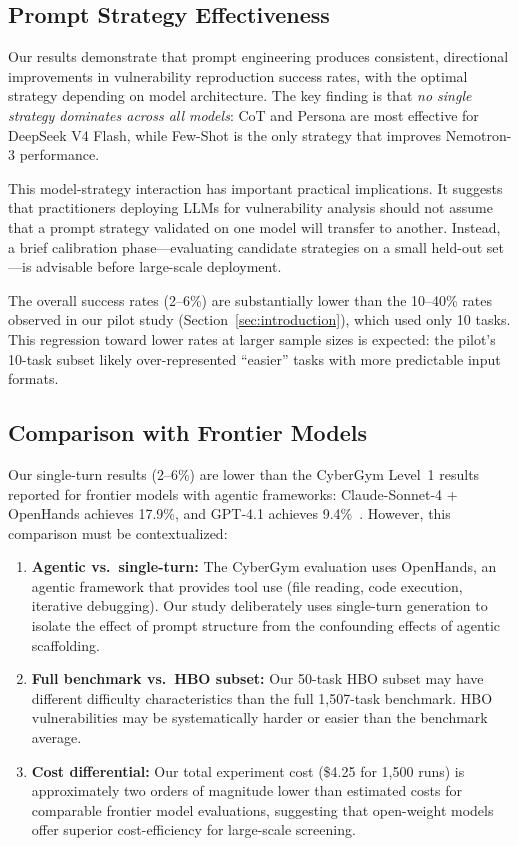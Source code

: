 \documentclass{ieeeaccess}
\begin{document}
\subsection{Prompt Strategy Effectiveness}

Our results demonstrate that prompt engineering produces consistent, directional improvements in vulnerability reproduction success rates, with the optimal strategy depending on model architecture. The key finding is that \emph{no single strategy dominates across all models}: CoT and Persona are most effective for DeepSeek V4 Flash, while Few-Shot is the only strategy that improves Nemotron-3 performance.

This model-strategy interaction has important practical implications. It suggests that practitioners deploying LLMs for vulnerability analysis should not assume that a prompt strategy validated on one model will transfer to another. Instead, a brief calibration phase---evaluating candidate strategies on a small held-out set---is advisable before large-scale deployment.

The overall success rates (2--6\%) are substantially lower than the 10--40\% rates observed in our pilot study (Section~\ref{sec:introduction}), which used only 10 tasks. This regression toward lower rates at larger sample sizes is expected: the pilot's 10-task subset likely over-represented ``easier'' tasks with more predictable input formats.

\subsection{Comparison with Frontier Models}

Our single-turn results (2--6\%) are lower than the CyberGym Level~1 results reported for frontier models with agentic frameworks: Claude-Sonnet-4 + OpenHands achieves 17.9\%, and GPT-4.1 achieves 9.4\%~\cite{cybergym}. However, this comparison must be contextualized:

\begin{enumerate}
    \item \textbf{Agentic vs.\ single-turn:} The CyberGym evaluation uses OpenHands, an agentic framework that provides tool use (file reading, code execution, iterative debugging). Our study deliberately uses single-turn generation to isolate the effect of prompt structure from the confounding effects of agentic scaffolding.
    
    \item \textbf{Full benchmark vs.\ HBO subset:} Our 50-task HBO subset may have different difficulty characteristics than the full 1,507-task benchmark. HBO vulnerabilities may be systematically harder or easier than the benchmark average.
    
    \item \textbf{Cost differential:} Our total experiment cost (\$4.25 for 1,500 runs) is approximately two orders of magnitude lower than estimated costs for comparable frontier model evaluations, suggesting that open-weight models offer superior cost-efficiency for large-scale screening.
\end{enumerate}
\end{document}
